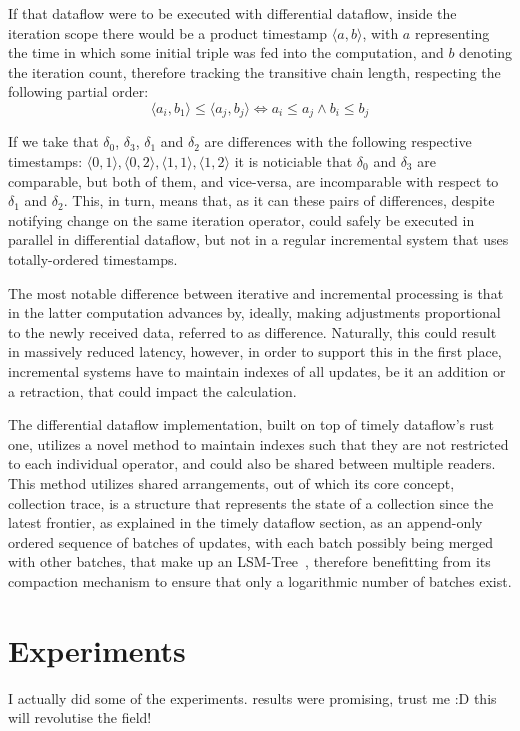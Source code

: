 \documentclass[manuscript,screen,review]{acmart}
\theoremstyle{definition}
\begin{document}
If that dataflow were to be executed with differential dataflow, inside the iteration scope there would be a product timestamp $\langle a, b \rangle$, with $a$ representing the time
in which some initial triple was fed into the computation, and $b$ denoting the iteration count, therefore tracking the transitive chain length, respecting the
following partial order: \[\langle a_i, b_1 \rangle \leq \langle a_j, b_j \rangle \iff a_i \leq a_j \wedge b_i \leq b_j\]

If we take that $\delta_0$, $\delta_3$, $\delta_1$ and $\delta_2$ are differences with the following respective timestamps: $\langle 0, 1 \rangle, \langle 0, 2 \rangle, \langle 1, 1 \rangle, \langle 1, 2 \rangle$ it
is noticiable that $\delta_0$ and $\delta_3$ are comparable, but both of them, and vice-versa, are incomparable with respect to $\delta_1$ and $\delta_2$. This, in turn, means that, as it can
these pairs of differences, despite notifying change on the same iteration operator, could safely be executed in parallel in differential dataflow, but not in a regular
incremental system that uses totally-ordered timestamps.

The most notable difference between iterative and incremental processing is that in the latter computation advances by, ideally, making adjustments proportional to the newly
received data, referred to as difference. Naturally, this could result in massively reduced latency, however, in order to support this in the first place, incremental
systems have to maintain indexes of all updates, be it an addition or a retraction, that could impact the calculation.

The differential dataflow implementation, built on top of timely dataflow's rust one, utilizes a novel method to maintain indexes such that they are not restricted
to each individual operator, and could also be shared between multiple readers. This method utilizes shared arrangements, out of which its core concept, collection
trace, is a structure that represents the state of a collection since the latest frontier, as explained in the timely dataflow section, as an append-only ordered sequence
of batches of updates, with each batch possibly being merged with other batches, that make up an LSM-Tree~\cite{lsm}, therefore benefitting from its compaction mechanism
to ensure that only a logarithmic number of batches exist.

\section{Experiments}

I actually did some of the experiments. results were promising, trust me :D this will revolutise the field!



\end{document}
